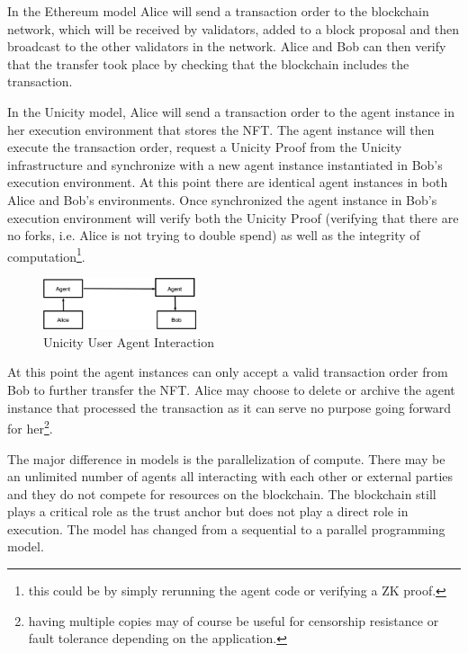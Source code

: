 \documentclass{article}
\begin{document}
In the Ethereum model Alice will send a transaction order to the blockchain network, which will be received by validators, added to a block proposal and then broadcast to the other validators in the network. Alice and Bob can then verify that the transfer took place by checking that the blockchain includes the transaction.
\vspace{2mm}

In the Unicity model, Alice will send a transaction order to the agent instance in her execution environment that stores the NFT. The agent instance will then execute the transaction order, request a Unicity Proof from the Unicity infrastructure and synchronize with a new agent instance instantiated in Bob's execution environment. At this point there are identical agent instances in both Alice and Bob's environments. Once synchronized the agent instance in Bob's execution environment will verify both the Unicity Proof (verifying that there are no forks, i.e. Alice is not trying to double spend) as well as the integrity of computation\footnote{this could be by simply rerunning the agent code or verifying a ZK proof.}.

\begin{figure}[htbp]
    \centering
    \includegraphics[width=0.4\textwidth]{UserAgent.png}
    \caption{Unicity User Agent Interaction}
    \label{fig:UserAgent}
\end{figure}

At this point the agent instances can only accept a valid transaction order from Bob to further transfer the NFT. Alice may choose to delete or archive the agent instance that processed the transaction as it can serve no purpose going forward for her\footnote{having multiple copies may of course be useful for censorship resistance or fault tolerance depending on the application.}. 

\vspace{2mm}

The major difference in models is the parallelization of compute. There may be an unlimited number of agents all interacting with each other or external parties and they do not compete for resources on the blockchain. The blockchain still plays a critical role as the trust anchor but does not play a direct role in execution. The model has changed from a sequential to a parallel programming model.
\vspace{2mm}
\end{document}
